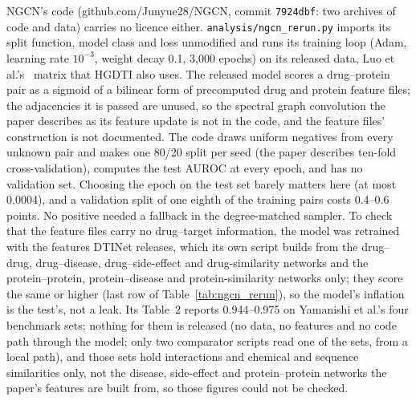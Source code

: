 \documentclass[review]{elsarticle}
\begin{document}


NGCN's code (github.com/Junyue28/NGCN, commit \texttt{7924dbf}: two archives of code and data) carries no licence
either. \texttt{analysis/ngcn\_rerun.py} imports its split function, model class and loss unmodified and runs its
training loop (Adam, learning rate $10^{-3}$, weight decay 0.1, 3,000 epochs) on its released data, Luo et
al.'s~\cite{luo2017dtinet} matrix that HGDTI also uses. The released model scores a drug--protein pair as a
sigmoid of a bilinear form of precomputed drug and protein feature files; the adjacencies it is passed are
unused, so the spectral graph convolution the paper describes as its feature update is not in the code, and the
feature files' construction is not documented. The code draws uniform negatives from every unknown pair and
makes one 80/20 split per seed (the paper describes ten-fold cross-validation), computes the test AUROC at every
epoch, and has no validation set. Choosing the epoch on the test set barely matters here (at most 0.0004), and
a validation split of one eighth of the training pairs costs 0.4--0.6 points. No positive needed a fallback in
the degree-matched sampler. To check that the feature files carry no drug--target information, the model was
retrained with the features DTINet releases, which its own script builds from the drug--drug, drug--disease,
drug--side-effect and drug-similarity networks and the protein--protein, protein--disease and protein-similarity
networks only; they score the same or higher (last row of Table~\ref{tab:ngcn_rerun}), so the model's
inflation is the test's, not a leak. Its Table~2 reports 0.944--0.975 on Yamanishi et al.'s four benchmark
sets; nothing for them is released (no data, no features and no code path through the model; only two
comparator scripts read one of the sets, from a local path), and those sets hold interactions and chemical and
sequence similarities only, not the disease, side-effect and protein--protein networks the paper's features are
built from, so those figures could not be checked.


\end{document}
